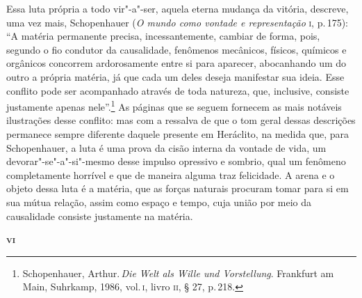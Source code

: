 Essa luta própria a todo vir"-a"-ser, aquela eterna mudança da vitória,
descreve, uma vez mais, Schopenhauer (\textit{O mundo como vontade e
representação} \textsc{i}, p.\,175): ``A matéria permanente precisa,
incessantemente, cambiar de forma, pois, segundo o fio condutor da
causalidade, fenômenos mecânicos, físicos, químicos e orgânicos concorrem
ardorosamente entre si para aparecer, abocanhando um do outro a própria
matéria, já que cada um deles deseja manifestar sua ideia. Esse conflito pode
ser acompanhado através de toda natureza, que, inclusive, consiste justamente
apenas nele''.\footnote{ Schopenhauer, Arthur.\,\textit{Die Welt als Wille und
Vorstellung}. Frankfurt am Main, Suhrkamp, 1986, vol.\,\textsc{i}, livro \textsc{ii}, 
§ 27, p.\,218.} As páginas que se seguem fornecem as mais notáveis ilustrações 
desse conflito: mas com a ressalva de que o tom geral dessas descrições permanece 
sempre diferente daquele presente em Heráclito, na medida que, para Schopenhauer, 
a luta é uma prova da cisão interna da vontade de vida, um devorar"-se"-a"-si"-mesmo 
desse impulso opressivo e sombrio, qual um fenômeno completamente horrível e que de maneira
alguma traz felicidade. A arena e o objeto dessa luta é a matéria, que as forças naturais 
procuram tomar para si em sua mútua relação, assim como espaço e tempo, cuja união por 
meio da causalidade consiste justamente na matéria. 

\bigskip
\textsc{\textbf{vi}}
\bigskip

